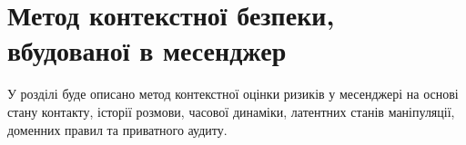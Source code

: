 \chapter{Метод контекстної безпеки, вбудованої в месенджер}

У розділі буде описано метод контекстної оцінки ризиків у месенджері на основі стану контакту, історії розмови, часової динаміки, латентних станів маніпуляції, доменних правил та приватного аудиту.
